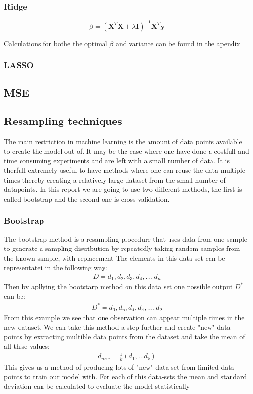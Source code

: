 \subsubsection{Ridge}
\begin{equation}
    \beta = (\textbf{X}^T \textbf{X} + \lambda \textbf{I})^{-1}\textbf{X}^T \textbf{y}
\end{equation}

Calculations for bothe the optimal $\beta$ and variance can be found in the apendix
\subsubsection{LASSO}

\subsection{MSE}


\subsection{Resampling techniques}

\noindent The main restriction in machine learning is 
the amount of data points available to create the model out of. It may be the case where one have
done a costfull and time consuming experiments and are left with a small number of data. 
It is therfull extremely useful to have methods where one can reuse the data multiple times
thereby creating a relatively large dataset from the small number of datapoints. In this report
we are going to use two different methods, the first is called bootstrap and the second one is cross validation.

\subsubsection{Bootstrap} 
\noindent The bootstrap method is a resampling procedure that uses data from one 
sample to generate a sampling distribution by repeatedly taking random 
samples from the known sample, with replacement %
The elements in this data set can be representatet in the following way:
\begin{align}
    D = {d_1, d_2, d_3, d_4, \dots, d_n}
\end{align}
Then by apllying the bootstarp method on this data set one possible output $D^{*}$ can be:
\begin{align}
    D^{*} = {d_3, d_n, d_4, d_4 , \dots, d_2}
\end{align}
From this example we see that one observation can appear multiple times in the new dataset.
We can take this method a step further and create "new" data points by extracting multible data points from 
the dataset and take the mean of all thise values:
\begin{align}
    d_{new} = \frac{1}{k}(d_1, \dots d_k)
\end{align}
This gives us a method of producing lots of "new" data-set from 
limited data points to train our model with. For each of this data-sets
the mean and standard deviation can be calculated to evaluate the model statistically. %


